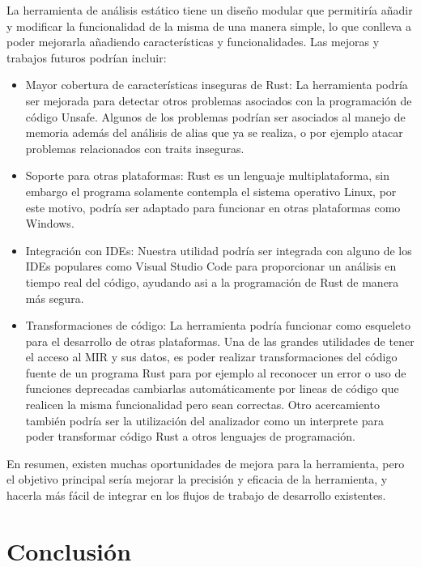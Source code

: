La herramienta de análisis estático tiene un diseño modular que permitiría añadir y modificar la funcionalidad de la misma de una manera simple, lo que conlleva a poder mejorarla añadiendo características y funcionalidades. Las mejoras y trabajos futuros podrían incluir:
\begin{itemize}
    \item Mayor cobertura de características inseguras de Rust: La herramienta podría ser mejorada para detectar otros problemas asociados con la programación de código Unsafe. Algunos de los problemas podrían ser asociados al manejo de memoria además del análisis de alias que ya se realiza, o por ejemplo atacar problemas relacionados con traits inseguras.
    \item Soporte para otras plataformas: Rust es un lenguaje multiplataforma, sin embargo el programa solamente contempla el sistema operativo Linux, por este motivo, podría ser adaptado para funcionar en otras plataformas como Windows.
    \item Integración con IDEs: Nuestra utilidad podría ser integrada con alguno de los IDEs populares como Visual Studio Code para proporcionar un análisis en tiempo real del código, ayudando asi a la programación de Rust de manera más segura.
    \item Transformaciones de código: La herramienta podría funcionar como esqueleto para el desarrollo de otras plataformas. Una de las grandes utilidades de tener el acceso al MIR y sus datos, es poder realizar transformaciones del código fuente de un programa Rust para por ejemplo al reconocer un error o uso de funciones deprecadas cambiarlas automáticamente por lineas de código que realicen la misma funcionalidad pero sean correctas. Otro acercamiento también podría ser la utilización del analizador como un interprete para poder transformar código Rust a otros lenguajes de programación.  
\end{itemize}
    
En resumen, existen muchas oportunidades de mejora para la herramienta, pero el objetivo principal sería mejorar la precisión y eficacia de la herramienta, y hacerla más fácil de integrar en los flujos de trabajo de desarrollo existentes.

\section{Conclusión}

